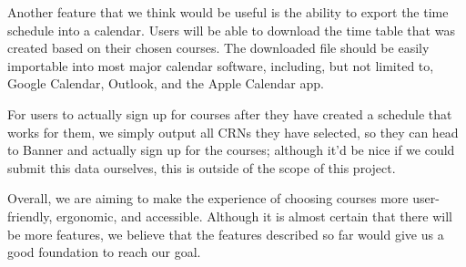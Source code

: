 \documentclass[12pt]{article}
\begin{document}
Another feature that we think would be useful is the ability to export the time schedule into a calendar. Users will be able to download the time table that was created based on their chosen courses. The downloaded file should be easily importable into most major calendar software, including, but not limited to, Google Calendar, Outlook, and the Apple Calendar app. \par
For users to actually sign up for courses after they have created a schedule that works for them, we simply output all CRNs they have selected, so they can head to Banner and actually sign up for the courses; although it'd be nice if we could submit this data ourselves, this is outside of the scope of this project. \par
Overall, we are aiming to make the experience of choosing courses more user-friendly, ergonomic, and accessible. Although it is almost certain that there will be more features, we believe that the features described so far would give us a good foundation to reach our goal.
\end{document}
